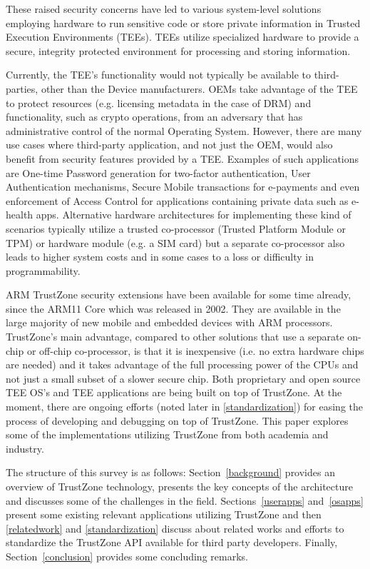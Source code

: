 \documentclass[cameraready]{cseminar}
\begin{document}
These raised security concerns have led to various system-level solutions employing hardware to run sensitive code or store private information in Trusted Execution Environments (TEEs). TEEs utilize specialized hardware to provide a secure, integrity protected environment for processing and storing information.

Currently, the TEE's functionality would not typically be available to third-parties, other than the Device manufacturers. OEMs take advantage of the TEE to protect resources (e.g. licensing metadata in the case of DRM) and functionality, such as crypto operations, from an adversary that has administrative control of the normal Operating System.
However, there are many use cases where third-party application, and not just the OEM, would also benefit from security features provided by a TEE. Examples of such applications are One-time Password generation for two-factor authentication, User Authentication mechanisms, Secure Mobile transactions for e-payments and even enforcement of Access Control for applications containing private data such as e-health apps. 
Alternative hardware architectures for implementing these kind of scenarios typically utilize a trusted co-processor (Trusted Platform Module or TPM) or hardware module (e.g. a SIM card) but a separate co-processor also leads to higher system costs and in some cases to a loss or difficulty in programmability.  

ARM TrustZone security extensions have been available for some time already, since the ARM11 Core which was released in 2002. They are available in the large majority of new mobile and embedded devices with ARM processors. TrustZone's main advantage, compared to other solutions that use a separate on-chip or off-chip co-processor,  is that it is inexpensive (i.e. no extra hardware chips are needed) and it takes advantage of the full processing power of the CPUs and not just a small subset of a slower secure chip. Both proprietary and open source TEE OS's and TEE applications are being built on top of TrustZone. At the moment,  there are ongoing efforts (noted later in \ref{standardization}) for easing the process of developing and debugging on top of TrustZone. This paper explores some of the implementations utilizing TrustZone from both academia and industry.

The structure of this survey is as follows: Section~\ref{background} provides an overview of TrustZone technology, presents the key concepts of the architecture and discusses some of the challenges in the field. Sections~\ref{userapps} and~\ref{osapps} present some existing relevant applications utilizing TrustZone and then \ref{relatedwork} and  \ref{standardization} discuss about related works and efforts to standardize the TrustZone API available for third party developers. Finally, Section~\ref{conclusion} provides some concluding remarks.
\end{document}
